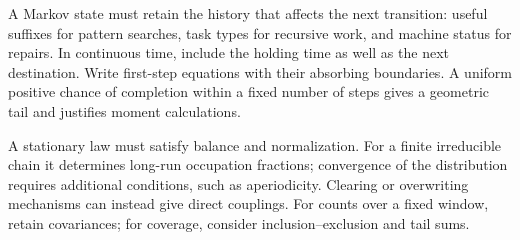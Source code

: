 A Markov state must retain the history that affects the next transition: useful suffixes for pattern searches, task types for recursive work, and machine status for repairs. In continuous time, include the holding time as well as the next destination. Write first-step equations with their absorbing boundaries. A uniform positive chance of completion within a fixed number of steps gives a geometric tail and justifies moment calculations.

A stationary law must satisfy balance and normalization. For a finite irreducible chain it determines long-run occupation fractions; convergence of the distribution requires additional conditions, such as aperiodicity. Clearing or overwriting mechanisms can instead give direct couplings. For counts over a fixed window, retain covariances; for coverage, consider inclusion--exclusion and tail sums.
\par\smallskip
